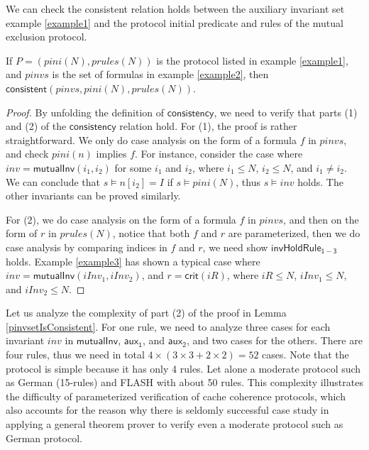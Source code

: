 \documentclass[final]{IEEEtran}
\def \eqc {=}
\def \iInv {iInv}
\begin{document}
{  %
We can check the consistent relation holds between the auxiliary invariant set example \ref{example1} and the protocol initial predicate and rules of the mutual exclusion protocol.
\begin{lemma} \label{pinvsetIsConsistent}
  If $ P=(pini(N),prules(N))$ is the protocol listed in example \ref{example1},  and $pinvs$ is the set of formulas in example \ref{example2},   then $\mathsf{consistent}(pinvs,pini(N),prules(N))$.
\end{lemma}
\begin{proof} By unfolding the definition of $\mathsf{consistency}$, we need
to verify that parts (1) and (2) of
 the $\mathsf{consistency}$ relation  hold.
For (1), the proof is rather straightforward.  We only do case analysis on the form of a formula $f$ in $pinvs$, and check $pini(n)$ implies $f$.  For instance,
consider the case where $inv= \mathsf{mutualInv}( i_1, i_2)$ for some $i_1$ and $i_2$, where
 $i_1\le N$, $i_2\le N$, and $i_1\neq i_2$. We can
 conclude that $s\models  n[i_2]\eqc I$ if $s\models pini(N)$,
thus $s\models inv$ holds. The other invariants can be
proved similarly.

\noindent For (2), we do case analysis on the form of a formula $f$ in $pinvs$, and then on the form of $r$ in $prules(N)$, notice that both $f$ and $r$ are parameterized, then we do case analysis by comparing indices in $f$ and $r$, we need show $\mathsf{invHoldRule_{1-3}}$ holds. Example \ref{example3} has shown a typical case where $inv=\mathsf{mutualInv} (\iInv_1, \iInv_2)$, and $r=\mathsf{crit }(iR)$, where $iR\le N$, $\iInv_1 \le N$, and $\iInv_2 \le N$.
\end{proof}

Let us     analyze the complexity of part (2) of the proof in Lemma \ref{pinvsetIsConsistent}.  For one rule, we need to analyze three  cases for each invariant $inv$ in
$\mathsf{mutualInv}$, $\mathsf{aux_1}$, and
$\mathsf{aux_2}$, and two cases for the others. There are four rules,
thus we need in total
$4\times (3 \times 3 +2\times 2)=52$ cases. Note that the  protocol
is simple because it has only 4 rules. Let alone a moderate
protocol such as German (15-rules) and FLASH with about 50 rules. This complexity illustrates the difficulty of parameterized verification of
cache coherence protocols, which also accounts for the reason why there is seldomly successful case study in applying a general theorem
 prover to verify even a moderate protocol such as German protocol.  

}
\end{document}
